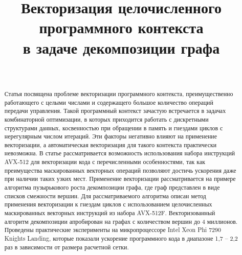 \documentclass[
11pt,%
tightenlines,%
twoside,%
onecolumn,%
nofloats,%
nobibnotes,%
nofootinbib,%
superscriptaddress,%
noshowpacs,%
centertags]%
{revtex4}
\begin{document}

\title{Векторизация целочисленного программного контекста \\ в задаче декомпозиции графа}

\author{~}




\begin{abstract} %
Статья посвящена проблеме векторизации программного контекста, преимущественно работающего с целыми числами и содержащего большое количество операций передачи управления.
Такой программный контекст зачастую встречается в задачах комбинаторной оптимизации, в которых приходится работать с дискретными структурами данных, косвенностью при обращении в память и гнездами циклов с нерегулярным числом итераций.
Эти факторы негативно влияют на применение векторизации, а автоматическая векторизация для такого контекста практически невозможна.
В статье рассматривается возможность использования набора инструкций AVX-512 для векторизации кода с перечисленными особенностями, так как преимущества маскированных векторных операций позволяют достичь ускорения даже при наличии таких узких мест.
Применение векторизации рассматривается на примере алгоритма пузырькового роста декомпозиции графа, где граф представлен в виде списков смежности вершин.
Для рассматриваемого алгоритма описан метод применения векторизации к гнездам циклов с использованием целочисленных маскированных векторных инструкций из набора AVX-512F.
Векторизованный алгоритм декомпозиции апробирован на графах с количеством вершин до 4 миллионов.
Проведены практические эксперименты на микропроцессоре Intel Xeon Phi 7290 Knights Landing, которые показали ускорение программного кода в диапазоне 1,7 -- 2,2 раз в зависимости от размера расчетной сетки.
\end{abstract}
\end{document}

